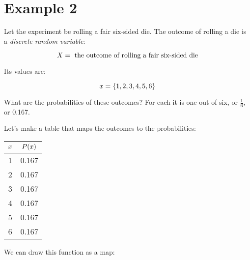 \documentclass[../../../main.tex]{subfiles}
\begin{document}
\section{Example 2}

Let the experiment be rolling a fair six-sided die. The outcome of rolling a die is a \emph{discrete random variable}:

\begin{equation*}
    \RandVar/ = \text{ the outcome of rolling a fair six-sided die}
\end{equation*}

\noindent
Its values are:

\begin{equation*}
    \RandVarVal/ = \{ 1, 2, 3, 4, 5, 6 \}
\end{equation*}

\noindent
What are the probabilities of these outcomes? For each it is one out of six, or $\frac{1}{6}$, or 0.167.

Let's make a table that maps the outcomes to the probabilities:

\begin{center}
  \begin{tabular}{| c | c |}
    \hline
  $\RandVarVal/$ & $\Probability{\RandVarVal/}$  \\ \hline
               1 & 0.167 \\ \hline
               2 & 0.167 \\ \hline
               3 & 0.167 \\ \hline
               4 & 0.167 \\ \hline
               5 & 0.167 \\ \hline
               6 & 0.167 \\ \hline
  \end{tabular}
\end{center}

\noindent
We can draw this function as a map:

\begin{center}\end{center}
\end{document}
